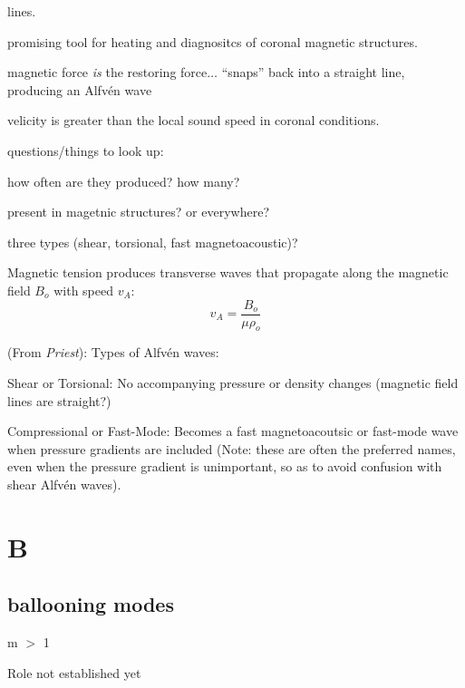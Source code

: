 \documentclass[12pt]{article}
\begin{document}
\begin{itemize*}
        lines.
    \item promising tool for heating and diagnositcs of
        coronal magnetic structures.
    \item magnetic force \emph{is} the restoring force$\ldots$ ``snaps'' back
        into a straight line, producing an Alfv\'en wave
    \item velicity is greater than the local sound speed in coronal conditions.
    \item questions/things to look up:
        \begin{itemize*}
            \item how often are they produced? how many?
            \item present in magetnic structures? or everywhere?
            \item three types (shear, torsional, fast magnetoacoustic)?
        \end{itemize*}
    \item Magnetic tension produces transverse waves that propagate
        along the magnetic field $B_{o}$ with speed $v_{A}$:
        $$ v_{A} = \frac{B_o}{\mu\rho_o} $$
    \item (From \emph{Priest}): Types of Alfv\'en waves:
        \begin{itemize*}
            \item Shear or Torsional: No accompanying pressure or
            density changes (magnetic field lines are straight?)
            \item Compressional or Fast-Mode: Becomes a fast
            magnetoacoutsic or fast-mode wave when pressure gradients
            are included (Note: these are often the preferred names,
            even when the pressure gradient is unimportant, so as to
            avoid confusion with shear Alfv\'en waves).
        \end{itemize*}
\end{itemize*}

\section*{B}

\subsection*{ballooning modes}
\begin{itemize*}
    \item m $>$ 1
    \item Role not established yet
\end{itemize*}
\end{document}
